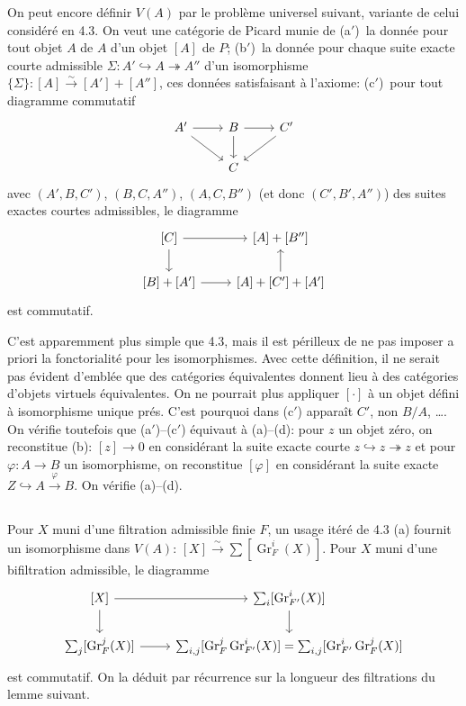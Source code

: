 \documentclass[12pt,a4paper]{article}
\theoremstyle{plain}
\theoremstyle{definition}
\DeclareMathOperator{\Gr}{Gr}
\begin{document}
On peut encore d\'efinir $V(A)$ par le probl\`eme universel suivant,
variante de celui consid\'er\'e en 4.3. On veut une cat\'egorie de Picard munie de
(a$'$)~la donn\'ee pour tout objet $A$ de $A$ d'un objet $[A]$ de $P$; (b$'$)~la donn\'ee
pour chaque suite exacte courte admissible $\Sigma: A' \hookrightarrow A \twoheadrightarrow A''$ d'un isomorphisme
$\{\Sigma\}: [A] \xrightarrow{\sim} [A'] + [A'']$, ces donn\'ees satisfaisant \`a l'axiome: (c$'$)~pour tout
diagramme commutatif
\[
\begin{tikzcd}
A' \arrow[r] \arrow[dr] & B \arrow[r] \arrow[d] & C' \arrow[dl] \\
& C &
\end{tikzcd}
\]
avec $(A', B, C')$, $(B, C, A'')$, $(A, C, B'')$ (et donc $(C', B', A'')$) des
suites exactes courtes admissibles, le diagramme
\[
\begin{tikzcd}
{[C]} \arrow[r] \arrow[d] & {[A] + [B'']} \\
{[B] + [A']} \arrow[r] & {[A] + [C'] + [A']} \arrow[u]
\end{tikzcd}
\]
est commutatif.

C'est apparemment plus simple que 4.3, mais il est p\'erilleux de ne pas imposer
a priori la fonctorialit\'e pour les isomorphismes. Avec cette d\'efinition, il ne
serait pas \'evident d'embl\'ee que des cat\'egories \'equivalentes donnent lieu \`a des
cat\'egories d'objets virtuels \'equivalentes. On ne pourrait plus appliquer $[\cdot]$
\`a un objet d\'efini \`a isomorphisme unique pr\'es. C'est pourquoi dans (c$'$) appara\^it
$C'$, non $B/A$, \ldots. On v\'erifie toutefois que (a$'$)--(c$'$) \'equivaut \`a (a)--(d):
pour $z$ un objet z\'ero, on reconstitue (b): $[z] \to 0$ en consid\'erant la suite
exacte courte $z \hookrightarrow z \twoheadrightarrow z$ et pour $\varphi: A \to B$ un isomorphisme, on reconstitue
$[\varphi]$ en consid\'erant la suite exacte $Z \hookrightarrow A \xrightarrow{\varphi} B$. On v\'erifie (a)--(d).

\subsection{}

Pour $X$ muni d'une filtration admissible finie $F$, un usage it\'er\'e de 4.3
(a) fournit un isomorphisme dans $V(A)$: $[X] \xrightarrow{\sim} \sum [\Gr_F^i(X)]$. Pour $X$ muni d'une
bifiltration admissible, le diagramme
\[
\begin{tikzcd}
{[X]} \arrow[r] \arrow[d] & \sum_i [\Gr_{F'}^i(X)] \arrow[d] \\
\sum_j [\Gr_F^j(X)] \arrow[r] & \sum_{i,j} [\Gr_F^j \Gr_{F'}^i(X)] = \sum_{i,j} [\Gr_{F'}^i \Gr_F^j(X)]
\end{tikzcd}
\]
est commutatif. On la d\'eduit par r\'ecurrence sur la longueur des filtrations du
lemme suivant.
\end{document}
